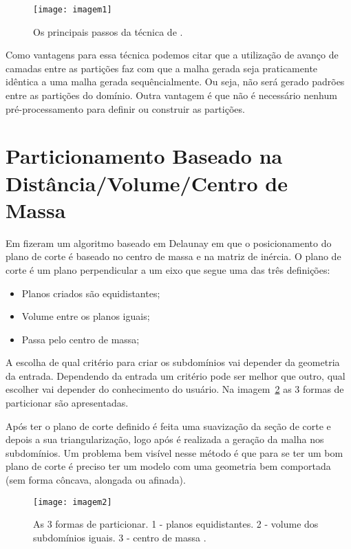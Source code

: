  \begin{figure}[htbp]
     \centering
     \texttt{[image: imagem1]}
     \caption{Os principais passos da técnica de \cite{bib:Pirzadeh09}.}
     \label{fig:imagem1}
 \end{figure}
 
 Como vantagens para essa técnica podemos citar que a utilização de avanço de camadas entre as partições faz com que a malha gerada seja praticamente idêntica a uma malha gerada sequêncialmente. Ou seja, não será gerado padrões entre as partições do domínio. Outra vantagem é que não é necessário nenhum pré-processamento para definir ou construir as partições.

\section{Particionamento Baseado na Distância/Volume/Centro de Massa}
 
Em \cite{bib:Ivanov06} fizeram um algoritmo baseado em Delaunay em que o posicionamento do plano de corte é baseado no centro de massa e na matriz de inércia. O plano de corte é um plano perpendicular a um eixo que segue uma das três definições:

\begin{itemize}
  \item Planos criados são equidistantes;

  \item Volume entre os planos iguais;

  \item Passa pelo centro de massa;
\end{itemize}

A escolha de qual critério para criar os subdomínios vai depender da geometria da entrada. Dependendo da entrada um critério pode ser melhor que outro, qual escolher vai depender do conhecimento do usuário. Na imagem~\ref{fig:imagem2} as 3 formas de particionar são apresentadas.

Após ter o plano de corte definido é feita uma suavização da seção de corte e depois a sua triangularização, logo após é realizada a geração da malha nos subdomínios. Um problema bem visível nesse método é que para se ter um bom plano de corte é preciso ter um modelo com uma geometria bem comportada (sem forma côncava, alongada ou afinada).

 \begin{figure}[htbp]
     \centering
     \texttt{[image: imagem2]}
     \caption{As 3 formas de particionar. 1 - planos equidistantes. 2 - volume dos subdomínios iguais. 3 - centro de massa \cite{bib:Ivanov06}.}
     \label{fig:imagem2}
 \end{figure}

